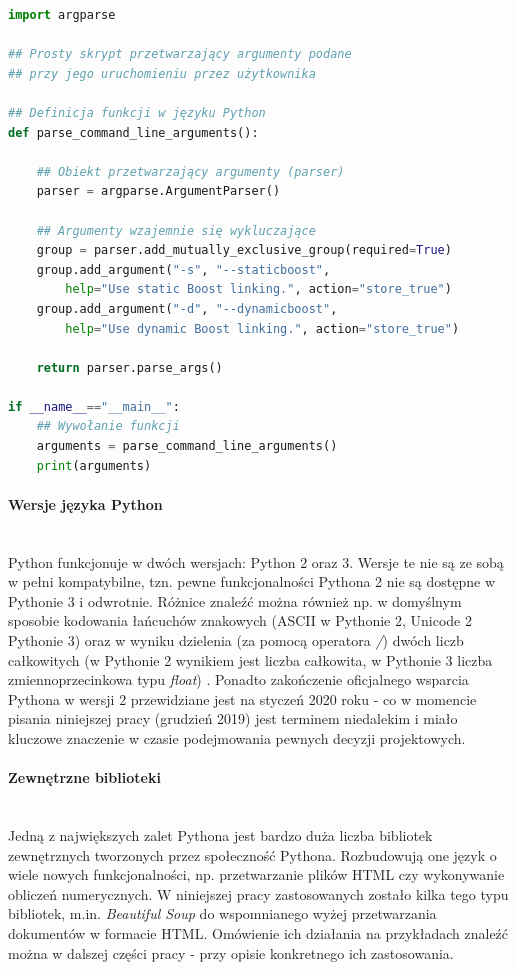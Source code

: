 \begin{lstlisting}[language=python,caption={Przykład prostego skryptu napisanego w języku Python 3 - przetwarzanie argumentów podanych przez użytkownika do skryptu}, label={lst:pyexample}]
import argparse

## Prosty skrypt przetwarzający argumenty podane 
## przy jego uruchomieniu przez użytkownika

## Definicja funkcji w języku Python
def parse_command_line_arguments():

    ## Obiekt przetwarzający argumenty (parser)
    parser = argparse.ArgumentParser()

    ## Argumenty wzajemnie się wykluczające
    group = parser.add_mutually_exclusive_group(required=True)
    group.add_argument("-s", "--staticboost", 
        help="Use static Boost linking.", action="store_true")
    group.add_argument("-d", "--dynamicboost",
        help="Use dynamic Boost linking.", action="store_true")

    return parser.parse_args()

if __name__=="__main__":
    ## Wywołanie funkcji
    arguments = parse_command_line_arguments()
    print(arguments)


\end{lstlisting}

\paragraph*{Wersje języka Python}\mbox{} \\
Python funkcjonuje w dwóch wersjach: Python 2 oraz 3. Wersje te nie są ze sobą w pełni kompatybilne, tzn. pewne funkcjonalności Pythona 2 nie są dostępne w Pythonie 3 i odwrotnie. Różnice znaleźć można również np. w domyślnym sposobie kodowania łańcuchów znakowych (ASCII w Pythonie 2, Unicode 2 Pythonie 3) oraz w wyniku dzielenia (za pomocą operatora \textit{/}) dwóch liczb całkowitych (w Pythonie 2 wynikiem jest liczba całkowita, w Pythonie 3 liczba zmiennoprzecinkowa typu \textit{float}) \cite{Python2vs3}. Ponadto zakończenie oficjalnego wsparcia Pythona w wersji 2 przewidziane jest na styczeń 2020 roku \cite{Python2Countdown} - co w momencie pisania niniejszej pracy (grudzień 2019) jest terminem niedalekim i miało kluczowe znaczenie w czasie podejmowania pewnych decyzji projektowych.

\paragraph*{Zewnętrzne biblioteki}\mbox{} \\
Jedną z największych zalet Pythona jest bardzo duża liczba bibliotek zewnętrznych tworzonych przez społeczność Pythona. Rozbudowują one język o wiele nowych funkcjonalności, np. przetwarzanie plików HTML czy wykonywanie obliczeń numerycznych. W niniejszej pracy zastosowanych zostało kilka tego typu bibliotek, m.in. \textit{Beautiful Soup} do wspomnianego wyżej przetwarzania dokumentów w formacie HTML. Omówienie ich działania na przykładach znaleźć można w dalszej części pracy - przy opisie konkretnego ich zastosowania. 




